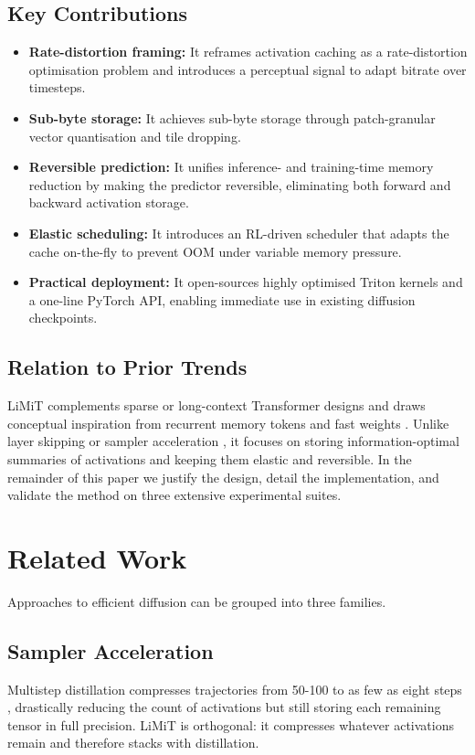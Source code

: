 \documentclass{article}
\begin{document}
\subsection{Key Contributions}
\begin{itemize}
  \item \textbf{Rate-distortion framing:} It reframes activation caching as a rate-distortion optimisation problem and introduces a perceptual signal to adapt bitrate over timesteps.
  \item \textbf{Sub-byte storage:} It achieves sub-byte storage through patch-granular vector quantisation and tile dropping.
  \item \textbf{Reversible prediction:} It unifies inference- and training-time memory reduction by making the predictor reversible, eliminating both forward and backward activation storage.
  \item \textbf{Elastic scheduling:} It introduces an RL-driven scheduler that adapts the cache on-the-fly to prevent OOM under variable memory pressure.
  \item \textbf{Practical deployment:} It open-sources highly optimised Triton kernels and a one-line PyTorch API, enabling immediate use in existing diffusion checkpoints.
\end{itemize}

\subsection{Relation to Prior Trends}
LiMiT complements sparse or long-context Transformer designs \cite{child-2019-generating,beltagy-2020-longformer,ainslie-2020-etc,chen-2024-edt} and draws conceptual inspiration from recurrent memory tokens and fast weights \cite{bulatov-2022-recurrent,burtsev-2020-memory,ba-2016-using}. Unlike layer skipping \cite{ma-2024-learning} or sampler acceleration \cite{salimans-2024-multistep}, it focuses on storing information-optimal summaries of activations and keeping them elastic and reversible. In the remainder of this paper we justify the design, detail the implementation, and validate the method on three extensive experimental suites.

\section{Related Work}
Approaches to efficient diffusion can be grouped into three families.

\subsection{Sampler Acceleration}
Multistep distillation compresses trajectories from 50-100 to as few as eight steps \cite{salimans-2024-multistep}, drastically reducing the count of activations but still storing each remaining tensor in full precision. LiMiT is orthogonal: it compresses whatever activations remain and therefore stacks with distillation.
\end{document}
